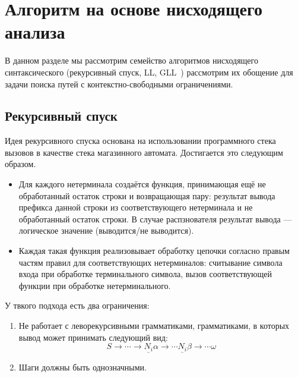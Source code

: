 \chapter{Алгоритм на основе нисходящего анализа}

В данном разделе мы рассмотрим семейство алгоритмов нисходящего синтаксического (рекурсивный спуск, LL, GLL~\cite{Scott:2010:GP:1860132.1860320,10.1007/978-3-662-46663-6_5}) рассмотрим их обощение для задачи поиска путей с контекстно-свободными ограничениями. 


\section{Рекурсивный спуск}

Идея рекурсивного спуска основана на использовании программного стека вызовов в качестве стека магазинного автомата. Достигается это следующим образом.
\begin{itemize}
  \item Для каждого нетерминала создаётся функция, принимающая ещё не обработанный остаток строки и возвращающая пару: результат вывода префикса данной строки из соответствующего нетерминала и не обработанный остаток строки. В случае распзнователя результат вывода --- логическое значение (выводится/не выводится).
  \item Каждая такая функция реализовывает обработку цепочки согласно правым частям правил для соответствующих нетерминалов: считывание символа входа при обработке терминального символа, вызов соответствующей функции при обработке нетерминального.
\end{itemize}

У твкого подхода есть два ограничения:
\begin{enumerate}
  \item Не работает с леворекурсивными грамматиками, грамматиками, в которых вывод может принимать следующий вид: 
  $$
  S \to \cdots \to \underline{N_i} \alpha \to \cdots \underline{N_i} \beta \to \cdots \omega
  $$
  \item Шаги должны быть однозначными.
\end{enumerate}

